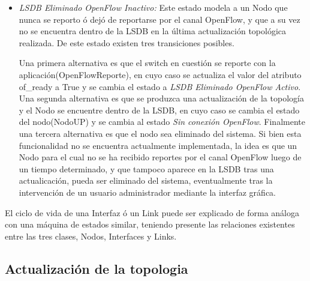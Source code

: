 \begin{itemize}
De este estado existen tres transiciones posibles. Por un lado el nodo puede estar presente en la LSDB al producirse una actualizaci\'on de la topolog\'ia(LSDBSyncActualizarTopologia), actualizandose la informaci\'on del nodo(ActualizarNodo) y manteniéndose en el mismo estado. Por otro lado tambi\'en al producirse una actualizaci\'on de la topolog\'ia, el nodo puede no estar en la LSDB, en cuyo caso se actualiza el estado del nodo(NodoDOWN) y se cambia al estado \textit{LSDB Eliminado OpenFlow Inactivo}. Finalmente el switch puede empezar a reportarse por el canal OpenFlow(OpenFlowReport) en cuyo caso se actualiza el valor del atributo of\_ready a True, y se cambia al estado \textit{Operativo}.  

\item \textit{LSDB Eliminado OpenFlow Inactivo:} Este estado modela a un Nodo que nunca se reporto \'o dej\'o de reportarse por el canal OpenFlow, y que a su vez no se encuentra dentro de la LSDB en la \'ultima actualizaci\'on topol\'ogica realizada. De este estado existen tres transiciones posibles.

Una primera alternativa es que el switch en cuesti\'on se reporte con la aplicaci\'on(OpenFlowReporte), en cuyo caso se actualiza el valor del atributo of\_ready a True y se cambia el estado a \textit{LSDB Eliminado OpenFlow Activo}. Una segunda alternativa es que se produzca una actualizaci\'on de la topolog\'ia y el Nodo se encuentre dentro de la LSDB, en cuyo caso se cambia el estado del nodo(NodoUP) y se cambia al estado \textit{Sin conexión OpenFlow}. Finalmente una tercera alternativa es que el nodo  sea eliminado del sistema. Si bien esta funcionalidad no se encuentra actualmente implementada, la idea es que un Nodo para el cual no se ha recibido reportes por el canal OpenFlow luego de un tiempo determinado, y que tampoco aparece en la LSDB tras una actualicaci\'on, pueda ser eliminado del sistema, eventualmente tras la intervenci\'on de un usuario administrador mediante la interfaz gr\'afica.
  
\end{itemize}

El ciclo de vida de una Interfaz \'o un Link puede ser explicado de forma an\'aloga con una m\'aquina de estados similar, teniendo presente las relaciones existentes entre las tres clases, Nodos, Interfaces y Links.

\newpage
\subsection{Actualizaci\'on de la topologia}

